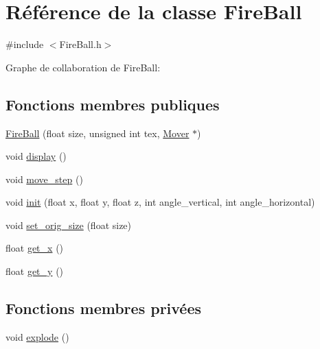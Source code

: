 \hypertarget{classFireBall}{}\section{Référence de la classe Fire\+Ball}
\label{classFireBall}


{\ttfamily \#include $<$Fire\+Ball.\+h$>$}



Graphe de collaboration de Fire\+Ball\+:
\subsection*{Fonctions membres publiques}
\begin{DoxyCompactItemize}
\item 
\hyperlink{classFireBall_a3b38dd5ab1ab31c60b2f50366c1b9f74}{Fire\+Ball} (float size, unsigned int tex, \hyperlink{classMover}{Mover} $\ast$)
\item 
void \hyperlink{classFireBall_af9bcb6c7a1ed6a8df73091de2be6e222}{display} ()
\item 
void \hyperlink{classFireBall_a7e064007c68fd6106189b0f69b1a850e}{move\+\_\+step} ()
\item 
void \hyperlink{classFireBall_acd649b7fc58547b2ac8cd09e22ca2b20}{init} (float x, float y, float z, int angle\+\_\+vertical, int angle\+\_\+horizontal)
\item 
void \hyperlink{classFireBall_a069586d69311159f80a1c8d3d848502e}{set\+\_\+orig\+\_\+size} (float size)
\item 
float \hyperlink{classFireBall_a4c71d3cf7209ef9e03ea38ea90c0d508}{get\+\_\+x} ()
\item 
float \hyperlink{classFireBall_a1b262f0d003fa19f87ce1d944fae56ab}{get\+\_\+y} ()
\end{DoxyCompactItemize}
\subsection*{Fonctions membres privées}
\begin{DoxyCompactItemize}
\item 
void \hyperlink{classFireBall_ab7e8e46f8cd978b77b16ee383581e1ff}{explode} ()
\end{DoxyCompactItemize}
